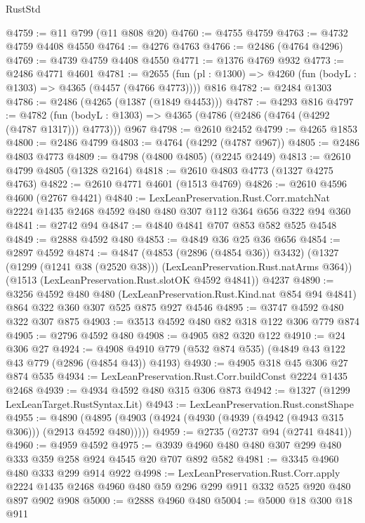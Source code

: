 \begin{lexlean}{RustStd}
\begin{coremodule}
@4759 := @11 @799 (@11 @808 @20)
@4760 := @4755 @4759
@4763 := @4732 @4759 @4408 @4550
@4764 := @4276 @4763
@4766 := @2486 (@4764 @4296)
@4769 := @4739 @4759 @4408 @4550
@4771 := @1376 @4769 @932
@4773 := @2486 @4771 @4601
@4781 := @2655 (fun (pl : @1300) => @4260 (fun (bodyL : @1303) => @4365 (@4457 (@4766 @4773)))) @816
@4782 := @2484 @1303
@4786 := @2486 (@4265 (@1387 (@1849 @4453)))
@4787 := @4293 @816
@4797 := @4782
    (fun (bodyL : @1303) => @4365 (@4786 (@2486 (@4764 (@4292 (@4787 @1317))) @4773)))
    @967
@4798 := @2610 @2452
@4799 := @4265 @1853
@4800 := @2486 @4799
@4803 := @4764 (@4292 (@4787 @967))
@4805 := @2486 @4803 @4773
@4809 := @4798 (@4800 @4805) (@2245 @2449)
@4813 := @2610 @4799 @4805 (@1328 @2164)
@4818 := @2610 @4803 @4773 (@1327 @4275 @4763)
@4822 := @2610 @4771 @4601 (@1513 @4769)
@4826 := @2610 @4596 @4600 (@2767 @4421)
@4840 := LexLeanPreservation.Rust.Corr.matchNat
    @2224
    @1435
    @2468
    @4592
    @480
    @480
    @307
    @112
    @364
    @656
    @322
    @94
    @360
@4841 := @2742 @94
@4847 := @4840 @4841 @707 @853 @582 @525 @4548
@4849 := @2888 @4592 @480
@4853 := @4849 @36 @25 @36 @656
@4854 := @2897 @4592
@4874 := @4847
    (@4853 (@2896 (@4854 @36)) @3432)
    (@1327 (@1299 (@1241 @38 (@2520 @38))) (LexLeanPreservation.Rust.natArms @364))
    (@1513 (LexLeanPreservation.Rust.slotOK @4592 @4841))
    @4237
@4890 := @3256
    @4592
    @480
    @480
    (LexLeanPreservation.Rust.Kind.nat @854 @94 @4841)
    @864
    @322
    @360
    @307
    @525
    @875
    @927
    @4546
@4895 := @3747 @4592 @480 @322 @307 @875
@4903 := @3513 @4592 @480 @82 @318 @122 @306 @779 @874
@4905 := @2796 @4592 @480
@4908 := @4905 @82 @320 @122
@4910 := @24 @306 @27
@4924 := @4908 @4910 @779 (@532 @874 @535) (@4849 @43 @122 @43 @779 (@2896 (@4854 @43)) @4193)
@4930 := @4905 @318 @45 @306 @27 @874 @535
@4934 := LexLeanPreservation.Rust.Corr.buildConst @2224 @1435 @2468
@4939 := @4934 @4592 @480 @315 @306 @873
@4942 := @1327 (@1299 LexLeanTarget.RustSyntax.Lit)
@4943 := LexLeanPreservation.Rust.constShape
@4955 := @4890 (@4895 (@4903 (@4924 (@4930 (@4939 (@4942 (@4943 @315 @306))) (@2913 @4592 @480)))))
@4959 := @2735 (@2737 @94 (@2741 @4841))
@4960 := @4959 @4592
@4975 := @3939 @4960 @480 @480 @307 @299 @480 @333 @359 @258 @924 @4545 @20 @707 @892 @582
@4981 := @3345 @4960 @480 @333 @299 @914 @922
@4998 := LexLeanPreservation.Rust.Corr.apply
    @2224
    @1435
    @2468
    @4960
    @480
    @59
    @296
    @299
    @911
    @332
    @525
    @920
    @480
    @897
    @902
    @908
@5000 := @2888 @4960 @480
@5004 := @5000 @18 @300 @18 @911

\end{coremodule}
\end{lexlean}
